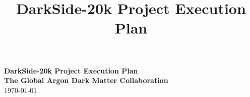 \documentclass[aps,superscriptaddress,floatfix,nofootinbib,showpacs,amsmath,amssymb,altaffilletter,floatfix,11pt]{revtex4-1}
\begin{document}
\setlength{\parindent}{1em}
\setdefaultleftmargin{1em}{1em}{}{}{}{}
\setcounter{page}{0}\thispagestyle{empty}
\onecolumngrid
\begin{center}
{\bf \LARGE DarkSide-20k Project Execution Plan}\\
\vspace{.5in}
{\bf \Large The Global Argon Dark Matter Collaboration}\\
\vspace{.5in}
\today
\end{center}
\vspace{.2in}

\clearpage
\newpage
{}
\title{DarkSide-20k Project Execution Plan}

\maketitle
\clearpage
\onecolumngrid
\setcounter{tocdepth}{2}
\tableofcontents
\makeatletter
\let\toc@pre\relax
\let\toc@post\relax
\makeatother
\clearpage
\listoffigures
\clearpage
\listoftables
\clearpage
\newpage
{}
\clearpage
















\clearpage
\appendix



%



\end{document}
